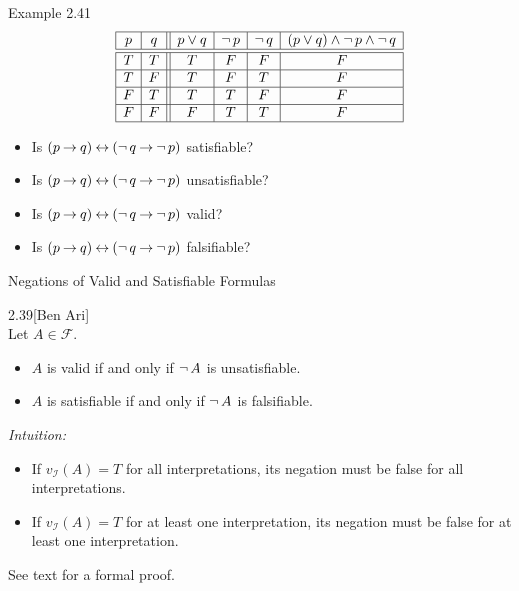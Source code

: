 \documentclass[style=sailor,size=12pt]{powerdot}
\begin{document}
\begin{wideslide}[bm=,toc=]{Example 2.41}
\begin{displaymath}
\begin{array}{|c|c||c|c|c|c|}
\hline
p & q & p \vee q & \mathop{\neg} p & \mathop{\neg} q &
(p \vee q) \wedge \mathop{\neg} p \wedge \mathop{\neg} q \\ \hline \hline
T & T & T & F & F & F \\ \hline
T & F & T & F & T & F \\ \hline
F & T & T & T & F & F \\ \hline
F & F & F & T & T & F \\ \hline
\end{array}
\end{displaymath}
\begin{itemize}
\item Is $(p\mathbin{\rightarrow} q)\mathbin{\leftrightarrow}  (\mathop{\neg} q\mathbin{\rightarrow} \mathop{\neg} p)$ satisfiable?
\item Is $(p\mathbin{\rightarrow} q)\mathbin{\leftrightarrow}  (\mathop{\neg} q\mathbin{\rightarrow} \mathop{\neg} p)$ unsatisfiable?
\item Is $(p\mathbin{\rightarrow} q)\mathbin{\leftrightarrow}  (\mathop{\neg} q\mathbin{\rightarrow} \mathop{\neg} p)$ valid?
\item Is $(p\mathbin{\rightarrow} q)\mathbin{\leftrightarrow}  (\mathop{\neg} q\mathbin{\rightarrow} \mathop{\neg} p)$ falsifiable?
\end{itemize}
\end{wideslide}

\begin{wideslide}[bm=,toc=]{Negations of Valid and Satisfiable Formulas}
\begin{thm}{2.39}[Ben Ari]
~\\Let $A \in \mathcal{F}$. 
\begin{itemize}
\item $A$ is valid if and only if $\mathop{\neg} A$ is unsatisfiable.
\item $A$ is satisfiable if and only if $\mathop{\neg} A$ is falsifiable.
\end{itemize}
\end{thm}
\emph{Intuition:}
\begin{itemize}
\item If $v_{\mathcal{I}}(A) = T$ for all interpretations, its
negation must be false for all interpretations.
\item If $v_{\mathcal{I}}(A) = T$ for at least one interpretation, its
negation must be false for at least one interpretation.
\end{itemize}
See text for a formal proof.
\end{wideslide}
\end{document}

